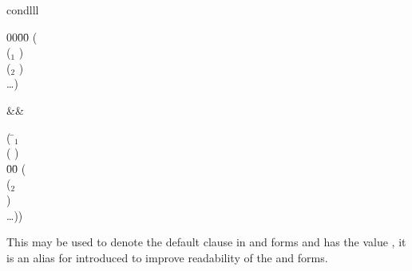 \begin{optDefinition}
\begin{RewriteTable}{cond}{lll}
\begin{minipage}[t]{0.45\columnwidth}
\begin{tabbing}
    00\=00\= \kill
    ( \\
    \>($_1$ ) \\
    \>($_2$ ) \\
    \>\ldots)
\end{tabbing}
\end{minipage}
&\rewrite&
\begin{minipage}[t]{0.45\columnwidth}
\begin{tabbing}
    ( \=$_1$ \\
    \>( ) \\
    \=00\= \kill
    \>( \\
    \>\>($_2$ \\
    \>\>\>) \\
    \>\>\ldots))
\end{tabbing}%
\end{minipage}%
\end{RewriteTable}

%
\remarks%
This may be used to denote the default clause in  and
 forms and has the value , \ie it is an alias for
 introduced to improve readability of the  and
 forms.


\end{optDefinition}
